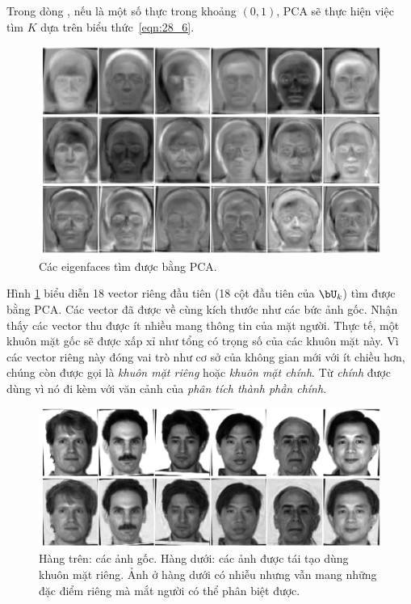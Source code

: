 Trong dòng , nếu
 là một số thực trong khoảng $(0, 1)$, PCA sẽ thực
hiện việc tìm $K$ dựa trên biểu thức~\eqref{eqn:28_6}.

\begin{figure}[t]
    \centering
    \includegraphics[width = \textwidth]{Chapters/content/28_pca2/latex/yaleb_eig.pdf}
    \caption[]{Các eigenfaces tìm được bằng PCA.}
    \label{fig:28_2}
\end{figure}

Hình \ref{fig:28_2} biểu diễn 18 vector riêng đầu tiên (18 cột đầu tiên của
$\bU_k$) tìm được bằng PCA. Các vector đã được  về cùng
kích thước như các bức ảnh gốc. Nhận thấy các
vector thu được ít nhiều mang thông tin của mặt người. Thực tế, một khuôn mặt
gốc sẽ được xấp xỉ như tổng có trọng số của các {khuôn mặt} này. Vì các
vector riêng này đóng vai trò như cơ sở của không gian mới với ít chiều hơn,
chúng còn được gọi là \textit{khuôn mặt riêng} hoặc \textit{khuôn mặt chính}. Từ \textit{chính} được dùng vì nó đi kèm với văn cảnh
của \textit{phân tích thành phần chính}.
\begin{figure}[t]
    \centering
    \includegraphics[width = \textwidth]{Chapters/content/28_pca2/latex/yaleb_ori_res.pdf}
    \caption[]{Hàng trên: các ảnh gốc. Hàng dưới: các ảnh được tái tạo dùng khuôn mặt riêng. Ảnh ở hàng dưới có nhiễu nhưng vẫn mang những đặc điểm riêng mà mắt người có thể phân biệt được.}
    \label{fig:28_3}
\end{figure}

